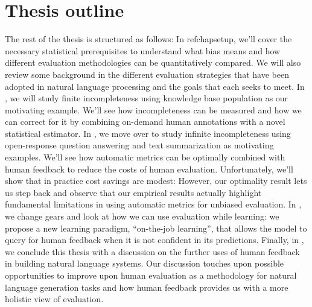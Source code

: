 \section{Thesis outline}
The rest of the thesis is structured as follows:
In refchap{setup}, we'll cover the necessary statistical prerequisites to understand what bias means and how different evaluation methodologies can be quantitatively compared.
We will also review some background in the different evaluation strategies that have been adopted in natural language processing and the goals that each seeks to meet.
In , we will study finite incompleteness using knowledge base population as our motivating example.
We'll see how incompleteness can be measured and how we can correct for it by combining on-demand human annotations with a novel statistical estimator.
In , we move over to study infinite incompleteness using open-response question answering and text summarization as motivating examples.
We'll see how automatic metrics can be optimally combined with human feedback to reduce the costs of human evaluation.
Unfortunately, we'll show that in practice cost savings are modest: 
However, our optimality result lets us step back and observe that our empirical results actually highlight fundamental limitations in using automatic metrics for unbiased evaluation. 
In , we change gears and look at how we can use evaluation while learning: we propose a new learning paradigm, ``on-the-job learning'', that allows the model to query for human feedback when it is not confident in its predictions.
Finally, in , we conclude this thesis with a discussion on the further uses of human feedback in building natural language systems.
Our discussion touches upon possible opportunities to improve upon human evaluation as a methodology for natural language generation tasks and how human feedback provides us with a more holistic view of evaluation.
